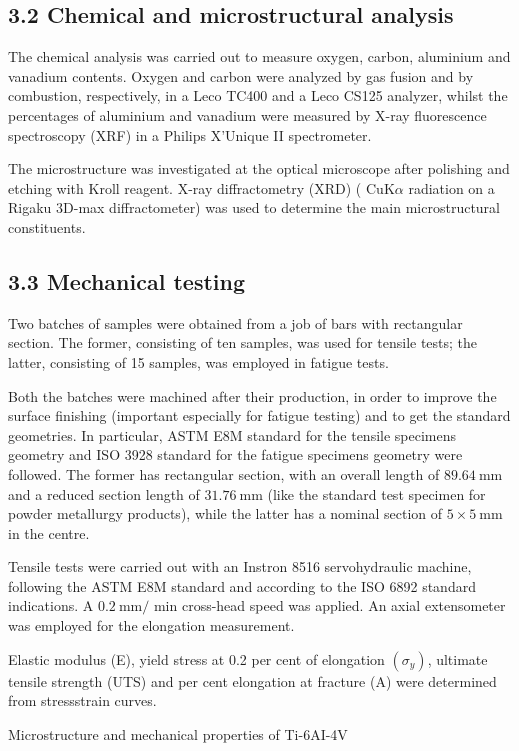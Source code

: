 \documentclass[10pt]{article}
\begin{document}
\subsection*{3.2 Chemical and microstructural analysis}
The chemical analysis was carried out to measure oxygen, carbon, aluminium and vanadium contents. Oxygen and carbon were analyzed by gas fusion and by combustion, respectively, in a Leco TC400 and a Leco CS125 analyzer, whilst the percentages of aluminium and vanadium were measured by X-ray fluorescence spectroscopy (XRF) in a Philips X'Unique II spectrometer.

The microstructure was investigated at the optical microscope after polishing and etching with Kroll reagent. X-ray diffractometry (XRD) ( $\mathrm{CuK} \alpha$ radiation on a Rigaku 3D-max diffractometer) was used to determine the main microstructural constituents.

\subsection*{3.3 Mechanical testing}
Two batches of samples were obtained from a job of bars with rectangular section. The former, consisting of ten samples, was used for tensile tests; the latter, consisting of 15 samples, was employed in fatigue tests.

Both the batches were machined after their production, in order to improve the surface finishing (important especially for fatigue testing) and to get the standard geometries. In particular, ASTM E8M standard for the tensile specimens geometry and ISO 3928 standard for the fatigue specimens geometry were followed. The former has rectangular section, with an overall length of $89.64 \mathrm{~mm}$ and a reduced section length of $31.76 \mathrm{~mm}$ (like the standard test specimen for powder metallurgy products), while the latter has a nominal section of $5 \times 5 \mathrm{~mm}$ in the centre.

Tensile tests were carried out with an Instron 8516 servohydraulic machine, following the ASTM E8M standard and according to the ISO 6892 standard indications. A $0.2 \mathrm{~mm} /$ min cross-head speed was applied. An axial extensometer was employed for the elongation measurement.

Elastic modulus (E), yield stress at 0.2 per cent of elongation $\left(\sigma_{y}\right)$, ultimate tensile strength (UTS) and per cent elongation at fracture (A) were determined from stressstrain curves.

Microstructure and mechanical properties of Ti-6AI-4V
\end{document}
